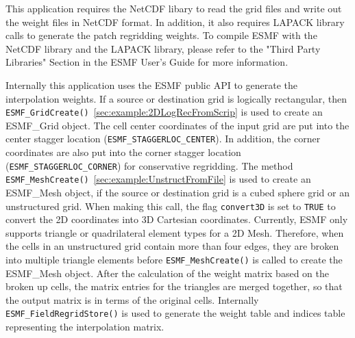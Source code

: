 This application requires the NetCDF libary to read the grid files and write
out the weight files in NetCDF format.  In addition, it also requires LAPACK
library calls to generate the patch regridding weights. To compile ESMF with
the NetCDF library and the LAPACK library, please refer to the "Third Party
Libraries" Section in the ESMF User's Guide for more information.

Internally this application uses the ESMF public API to generate the interpolation weights.
If a source or destination grid is logically rectangular, then {\tt ESMF\_GridCreate()}~\ref{sec:example:2DLogRecFromScrip} is used to create an ESMF\_Grid object. The cell center 
coordinates of the input grid are put into the center stagger location ({\tt ESMF\_STAGGERLOC\_CENTER}). 
In addition, the corner coordinates are also put into the corner stagger location 
({\tt ESMF\_STAGGERLOC\_CORNER}) for conservative regridding.  The method
{\tt ESMF\_MeshCreate()}~\ref{sec:example:UnstructFromFile} is used to create an ESMF\_Mesh object, if the 
source or destination grid is a cubed sphere grid or an unstructured grid. When making this call, 
the flag {\tt convert3D} is set to {\tt TRUE} to convert the 2D coordinates into 3D Cartesian coordinates. Currently, ESMF only supports
triangle or quadrilateral element types for a 2D Mesh.  Therefore, when the cells in an unstructured grid contain more than four edges, they are broken into multiple triangle elements before {\tt ESMF\_MeshCreate()} is called to create the ESMF\_Mesh object. After the calculation of the weight matrix based on the broken up
cells, the matrix entries for the triangles are merged together, so that the output matrix is in terms of the original cells.  
Internally {\tt ESMF\_FieldRegridStore()} is used to generate the weight table and indices table representing the interpolation matrix. 

